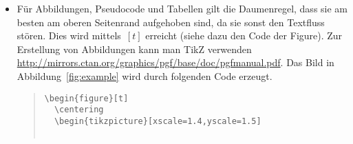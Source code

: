 \documentclass[12pt,a4paper]{article}
\begin{document}
\begin{itemize}
Ein Beispiel ist folgender Code:
\begin{verbatim}
\begin{algorithm}[t]
  \caption{An algorithm for finding a dominating clique~$S$. Vertex~$v_i$ is the first vertex of the dominating clique~$S$ in the fixed closure ordering~$\sigma$ of~$G$. Initially we have~$T:=\{v_i\}$.}
  \label{algo-branching-dc}
  \begin{algorithmic}[1]  
  \Procedure{\textit{SolveDC}}{$G, k, T$} 
  \State \algorithmicif\ $k=0$ \AND~$V(G)\neq N[T]$ \algorithmicthen\ \Return No \label{line-cdc-return-no}
  \State \algorithmicif\ $V(G) = N[T]$ \algorithmicthen\ \Return Yes\label{line-cdc-yes}
  \State Compute a vertex~$w$ such that~$v_iw\notin E(G)$ \label{line-cdc-compute-v-j}
  \ForEach{$u\in \bigcap_{x\in T}N(x)\cap N(w)\cap V(G_i)$} \label{line-cdc-branch1} \Comment {$G_i:=G[v_i, \ldots , v_n]$}
     \State \algorithmicif\ \textit{SolveDC}$(G - (N(u)\setminus N[v_i]), k - 1, T\cup\{u\})$ returns Yes \algorithmicthen\ \Return Yes \label{line-cdc-branch2}
  \EndFor
  \State \Return No
  \EndProcedure
  \end{algorithmic}
\end{algorithm}
\end{verbatim}
\begin{algorithm}[t]
  \caption{An algorithm for finding a dominating clique~$S$. Vertex~$v_i$ is the first vertex of the dominating clique~$S$ in the fixed closure ordering~$\sigma$ of~$G$. Initially we have~$T:=\{v_i\}$.}
  \label{algo-branching-dc}
  \begin{algorithmic}[1]  
  \State \algorithmicif\ $k=0$ \AND~$V(G)\neq N[T]$ \algorithmicthen\ \Return No \label{line-cdc-return-no}
  \State \algorithmicif\ $V(G) = N[T]$ \algorithmicthen\ \Return Yes\label{line-cdc-yes}
  \State Compute a vertex~$w$ such that~$v_iw\notin E(G)$ \label{line-cdc-compute-v-j}
   \label{line-cdc-branch1} 
     \State \algorithmicif\ \textit{SolveDC}$(G - (N(u)\setminus N[v_i]), k - 1, T\cup\{u\})$ returns Yes \algorithmicthen\ \Return Yes \label{line-cdc-branch2}
  \EndFor
  \State \Return No
  \EndProcedure
  \end{algorithmic}
\end{algorithm}
  
  
  
\item Für Abbildungen, Pseudocode und Tabellen gilt die Daumenregel, dass sie am besten am oberen Seitenrand aufgehoben sind, da sie sonst den Textfluss stören. Dies wird mittels~$[t]$ erreicht (siehe dazu den Code der Figure). Zur Erstellung von Abbildungen kann man TikZ verwenden \url{http://mirrors.ctan.org/graphics/pgf/base/doc/pgfmanual.pdf}. Das Bild in Abbildung~\ref{fig:example} wird durch folgenden Code erzeugt.
  \begin{quote}\small
\begin{verbatim}
\begin{figure}[t]
  \centering
  \begin{tikzpicture}[xscale=1.4,yscale=1.5]
    

\end{verbatim}
\end{quote}
\end{itemize}
\end{document}
